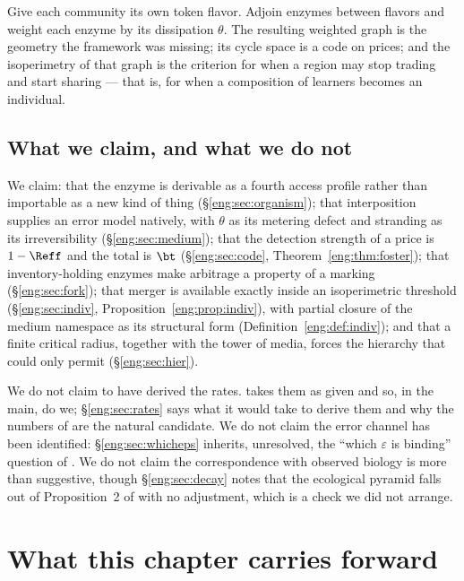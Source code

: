 Give each community its own token flavor. Adjoin enzymes between flavors
and weight each enzyme by its dissipation $\theta$. The resulting weighted
graph is the geometry the framework was missing; its cycle space is a code
on prices; and the isoperimetry of that graph is the criterion for when a
region may stop trading and start sharing --- that is, for when a
composition of learners becomes an individual.

\subsection{What we claim, and what we do not}\label{eng:S1.3}

We claim: that the enzyme is derivable as a fourth access profile rather
than importable as a new kind of thing (\S\ref{eng:sec:organism}); that
interposition supplies an error model natively, with $\theta$ as its
metering defect and stranding as its irreversibility
(\S\ref{eng:sec:medium}); that the
detection strength of a price is $1-\Reff$ and the total is $\bt$
(\S\ref{eng:sec:code}, Theorem~\ref{eng:thm:foster}); that inventory-holding
enzymes make arbitrage a property of a marking (\S\ref{eng:sec:fork}); that
merger is available exactly inside an isoperimetric threshold
(\S\ref{eng:sec:indiv}, Proposition~\ref{eng:prop:indiv}), with partial closure of
the medium namespace as its structural form
(Definition~\ref{eng:def:indiv}); and that a finite critical radius, together
with the tower of media, forces the hierarchy that \chComp could
only permit (\S\ref{eng:sec:hier}).

We do not claim to have derived the rates. \cite{vtok} takes them as given
and so, in the main, do we; \S\ref{eng:sec:rates} says what it would take to
derive them and why the numbers of \chGame are the natural candidate.
We do not claim the error channel has been identified: \S\ref{eng:sec:whicheps}
inherits, unresolved, the ``which $\varepsilon$ is binding'' question of
\cite{compaut}. We do not claim the correspondence with observed biology is
more than suggestive, though \S\ref{eng:sec:decay} notes that the ecological
pyramid falls out of Proposition~2 of \cite{vtok} with no adjustment, which
is a check we did not arrange.

\section{What this chapter carries forward}\label{eng:S2}

